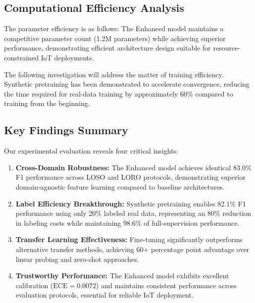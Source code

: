 \documentclass[journal]{IEEEtran}
\begin{document}
\subsection{Computational Efficiency Analysis}
The parameter efficiency is as follows: The Enhanced model maintains a competitive parameter count (1.2M parameters) while achieving superior performance, demonstrating efficient architecture design suitable for resource-constrained IoT deployments.

The following investigation will address the matter of training efficiency. Synthetic pretraining has been demonstrated to accelerate convergence, reducing the time required for real-data training by approximately 60\% compared to training from the beginning.


\subsection{Key Findings Summary}

Our experimental evaluation reveals four critical insights:

\begin{enumerate}
\item \textbf{Cross-Domain Robustness:} The Enhanced model achieves identical 83.0\% F1 performance across LOSO and LORO protocols, demonstrating superior domain-agnostic feature learning compared to baseline architectures.

\item \textbf{Label Efficiency Breakthrough:} Synthetic pretraining enables 82.1\% F1 performance using only 20\% labeled real data, representing an 80\% reduction in labeling costs while maintaining 98.6\% of full-supervision performance.

\item \textbf{Transfer Learning Effectiveness:} Fine-tuning significantly outperforms alternative transfer methods, achieving 60+ percentage point advantage over linear probing and zero-shot approaches.

\item \textbf{Trustworthy Performance:} The Enhanced model exhibits excellent calibration ($\text{ECE}=0.0072$) and maintains consistent performance across evaluation protocols, essential for reliable IoT deployment.
\end{enumerate}
\end{document}
